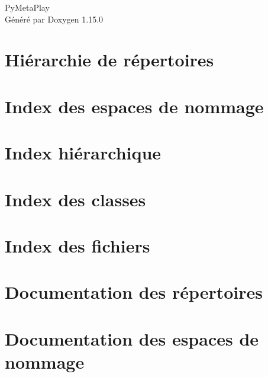 \documentclass[twoside]{book}
\newcommand{\+}{\discretionary{\mbox{\scriptsize$\hookleftarrow$}}{}{}}
\newcommand{\clearemptydoublepage}{%
    \newpage{\pagestyle{empty}\cleardoublepage}%
  }
\begin{document}
  \raggedbottom
    \hypersetup{pageanchor=false,
                bookmarksnumbered=true,
                pdfencoding=unicode
               }
  \begin{titlepage}
  \vspace*{7cm}
  \begin{center}%
  {\Large Py\+Meta\+Play}\\
  \vspace*{1cm}
  {\large Généré par Doxygen 1.15.0}\\
  \end{center}
  \end{titlepage}
  \clearemptydoublepage
  \tableofcontents
  \clearemptydoublepage
  \hypersetup{pageanchor=true}

\chapter{Hiérarchie de répertoires}

\chapter{Index des espaces de nommage}

\chapter{Index hiérarchique}

\chapter{Index des classes}

\chapter{Index des fichiers}

\chapter{Documentation des répertoires}



\chapter{Documentation des espaces de nommage}













\end{document}
